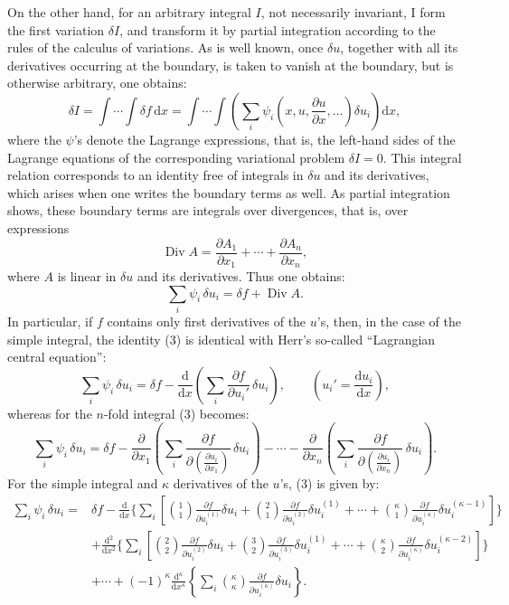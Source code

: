\documentclass[11pt]{article}
\providecommand{\dd}{\mathrm d}
\providecommand{\Div}{\operatorname{Div}}
\providecommand{\p}{\partial}
\begin{document}
On the other hand, for an arbitrary integral \(I\), not necessarily invariant, I form the first variation \(\delta I\), and transform it by partial integration according to the rules of the calculus of variations. As is well known, once \(\delta u\), together with all its derivatives occurring at the boundary, is taken to vanish at the boundary, but is otherwise arbitrary, one obtains:
\begin{equation}
\delta I=\int\!\cdots\!\int \delta f\,\dd x
=\int\!\cdots\!\int\left(\sum_i\psi_i\!\left(x,u,\frac{\p u}{\p x},\ldots\right)\delta u_i\right)\dd x,
\tag{2}
\end{equation}
where the \(\psi\)'s denote the Lagrange expressions, that is, the left-hand sides of the Lagrange equations of the corresponding variational problem \(\delta I=0\). This integral relation corresponds to an identity free of integrals in \(\delta u\) and its derivatives, which arises when one writes the boundary terms as well. As partial integration shows, these boundary terms are integrals over divergences, that is, over expressions
\[
\Div A=\frac{\p A_1}{\p x_1}+\cdots+\frac{\p A_n}{\p x_n},
\]
where \(A\) is linear in \(\delta u\) and its derivatives. Thus one obtains:
\begin{equation}
\sum_i\psi_i\,\delta u_i=\delta f+\Div A.
\tag{3}
\end{equation}
In particular, if \(f\) contains only first derivatives of the \(u\)'s, then, in the case of the simple integral, the identity (3) is identical with Herr's so-called ``Lagrangian central equation'':
\begin{equation}
\sum_i \psi_i\,\delta u_i
=\delta f-\frac{\dd}{\dd x}\left(\sum_i\frac{\p f}{\p u_i'}\,\delta u_i\right),
\qquad \left(u_i'=\frac{\dd u_i}{\dd x}\right),
\tag{4}
\end{equation}
whereas for the \(n\)-fold integral (3) becomes:
\begin{equation}
\sum_i\psi_i\,\delta u_i
=
\delta f
-\frac{\p}{\p x_1}\left(\sum_i\frac{\p f}{\p \left(\frac{\p u_i}{\p x_1}\right)}\,\delta u_i\right)
-\cdots
-\frac{\p}{\p x_n}\left(\sum_i\frac{\p f}{\p \left(\frac{\p u_i}{\p x_n}\right)}\,\delta u_i\right).
\tag{5}
\end{equation}
For the simple integral and \(\kappa\) derivatives of the \(u\)'s, (3) is given by:
\begin{equation}
\begin{aligned}
\sum_i\psi_i\,\delta u_i
={}&\delta f
-\frac{\dd}{\dd x}\Bigg\{\sum_i\left[
\binom{1}{1}\frac{\p f}{\p u_i^{(1)}}\delta u_i
+\binom{2}{1}\frac{\p f}{\p u_i^{(2)}}\delta u_i^{(1)}
+\cdots+
\binom{\kappa}{1}\frac{\p f}{\p u_i^{(\kappa)}}\delta u_i^{(\kappa-1)}
\right]\Bigg\}\\
&+\frac{\dd^2}{\dd x^2}\Bigg\{\sum_i\left[
\binom{2}{2}\frac{\p f}{\p u_i^{(2)}}\delta u_i
+\binom{3}{2}\frac{\p f}{\p u_i^{(3)}}\delta u_i^{(1)}
+\cdots+
\binom{\kappa}{2}\frac{\p f}{\p u_i^{(\kappa)}}\delta u_i^{(\kappa-2)}
\right]\Bigg\}\\
&+\cdots
+(-1)^\kappa\frac{\dd^\kappa}{\dd x^\kappa}
\left\{\sum_i\binom{\kappa}{\kappa}
\frac{\p f}{\p u_i^{(\kappa)}}\delta u_i\right\}.
\end{aligned}
\tag{6}
\end{equation}
\end{document}
